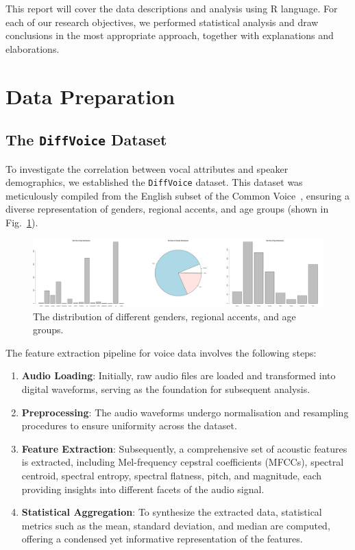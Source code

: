 \documentclass{article}
\begin{document}
	This report will cover the data descriptions and analysis using R language. For each of our research objectives, we performed statistical analysis and draw conclusions in the most appropriate approach, together with explanations and elaborations.
	
	
	\section{Data Preparation}
	
	\subsection{The \texttt{DiffVoice} Dataset}
	
	To investigate the correlation between vocal attributes and speaker demographics, we established the \texttt{DiffVoice} dataset. This dataset was meticulously compiled from the English subset of the Common Voice~\cite{ardila2019common}, ensuring a diverse representation of genders, regional accents, and age groups (shown in Fig.~\ref{distribution}).
	
	\begin{figure}
		\centering
		\includegraphics[width=\textwidth]{graphs/distribution.pdf}
		\caption{The distribution of different genders, regional accents, and age groups.}
		\label{distribution}
	\end{figure}
	
	The feature extraction pipeline for voice data involves the following steps:
	\begin{enumerate}
		\item \textbf{Audio Loading}: Initially, raw audio files are loaded and transformed into digital waveforms, serving as the foundation for subsequent analysis.
		\item \textbf{Preprocessing}: The audio waveforms undergo normalisation and resampling procedures to ensure uniformity across the dataset.
		\item \textbf{Feature Extraction}: Subsequently, a comprehensive set of acoustic features is extracted, including Mel-frequency cepstral coefficients (MFCCs), spectral centroid, spectral entropy, spectral flatness, pitch, and magnitude, each providing insights into different facets of the audio signal.
		\item \textbf{Statistical Aggregation}: To synthesize the extracted data, statistical metrics such as the mean, standard deviation, and median are computed, offering a condensed yet informative representation of the features.
	\end{enumerate}
	
\end{document}
